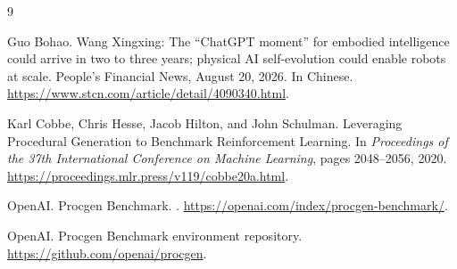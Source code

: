 \documentclass[a4paper,12pt]{article}
\begin{document}
\clearpage
\begin{thebibliography}{9}

Guo Bohao.
\newblock Wang Xingxing: The ``ChatGPT moment'' for embodied intelligence could arrive in two to three years; physical AI self-evolution could enable robots at scale.
\newblock People's Financial News, August 20, 2026. In Chinese.
\newblock \url{https://www.stcn.com/article/detail/4090340.html}.

Karl Cobbe, Chris Hesse, Jacob Hilton, and John Schulman.
\newblock Leveraging Procedural Generation to Benchmark Reinforcement Learning.
\newblock In \emph{Proceedings of the 37th International Conference on Machine Learning}, pages 2048--2056, 2020.
\newblock \url{https://proceedings.mlr.press/v119/cobbe20a.html}.

OpenAI.
\newblock Procgen Benchmark.
.
\newblock \url{https://openai.com/index/procgen-benchmark/}.

OpenAI.
\newblock Procgen Benchmark environment repository.
\newblock \url{https://github.com/openai/procgen}.

\end{thebibliography}
\end{document}
